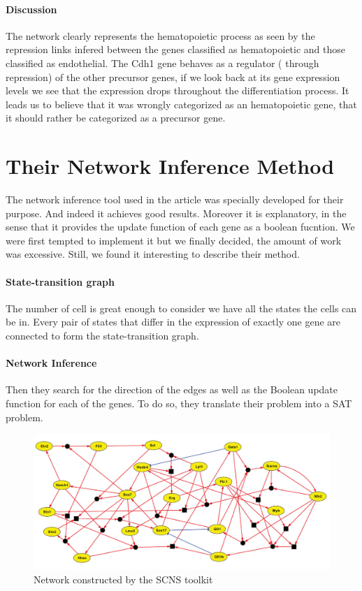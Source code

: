 \documentclass[a4paper,12pt]{book}
\theoremstyle{break}
\begin{document}
\paragraph{Discussion }The network clearly represents the hematopoietic process as seen by the repression links  infered between the genes classified as hematopoietic and those classified as endothelial. The Cdh1 gene behaves as a regulator ( through repression) of the other precursor genes, if we look back at its gene expression levels we see that the expression drops throughout the differentiation process. It leads us to believe that it was wrongly categorized as an hematopoietic gene, that it should rather be categorized as a precursor gene.

\section*{Their Network Inference Method}
The network inference tool used in the article was specially developed for their purpose. And indeed it achieves good results. Moreover it is explanatory, in the sense that it provides the update function of each gene as a boolean fucntion. We were first tempted to implement it but we finally decided, the amount of work was excessive. Still, we found it interesting to describe their method.

\paragraph{State-transition graph} 
The number of cell is great enough to consider we have all the states the cells can be in. Every pair of states that differ in the expression of exactly one gene are connected to form the state-transition graph.
\paragraph{Network Inference}
Then they search for the direction of the edges as well as the Boolean update function for each of the genes. To do so, they translate their problem into a SAT problem.

\begin{figure}[h!]
	\centering
	\includegraphics[width = \linewidth]{../Biblio/images/pap_network.png}
	\caption{Network constructed by the SCNS toolkit}
	\label{fig:scns}
\end{figure}
\end{document}
